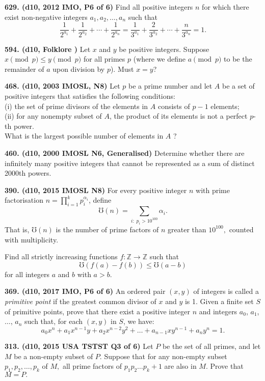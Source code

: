 \documentclass{article}
\begin{document}
\textbf{629. (\color{red}d10\color{black}, 2012 IMO, P6 of 6)} Find all positive integers $n$ for which there exist non-negative integers $a_1, a_2, \ldots, a_n$ such that
\[
    \frac{1}{2^{a_1}} + \frac{1}{2^{a_2}} + \cdots + \frac{1}{2^{a_n}} =
    \frac{1}{3^{a_1}} + \frac{2}{3^{a_2}} + \cdots + \frac{n}{3^{a_n}} = 1.
\]

\textbf{594. (\color{red}d10\color{black}, Folklore )} Let $x$ and $y$ be positive integers. Suppose $x \pmod{p} \leq y \pmod{p}$ for all primes $p$ (where we define $a \pmod{p}$ to be the remainder of $a$ upon division by $p$). Must $x = y$?

\textbf{468. (\color{red}d10\color{black}, 2003 IMOSL, N8)} Let $p$ be a prime number and let $A$ be a set of positive integers that satisfies the following conditions:\\ (i) the set of prime divisors of the elements in $A$ consists of $p-1$ elements;\\ (ii) for any nonempty subset of $A$, the product of its elements is not a perfect $p$-th power.\\ What is the largest possible number of elements in $A$ ?

\textbf{460. (\color{red}d10\color{black}, 2000 IMOSL N6, Generalised)} Determine whether there are infinitely many positive integers that cannot be represented as a sum of distinct 2000th powers.

\textbf{390. (\color{red}d10\color{black}, 2015 IMOSL N8)} For every positive integer $n$ with prime factorisation $\textstyle{n = \prod_{i = 1}^{k} p_i^{\alpha_i}}$, define \[\mho(n) = \sum_{i: \; p_i > 10^{100}} \alpha_i.\] That is, $\mho(n)$ is the number of prime factors of $n$ greater than $10^{100},$ counted with multiplicity.

\makebox[1.5em]{} Find all strictly increasing functions $f: \mathbb{Z} \to \mathbb{Z}$ such that \[\mho \left( f(a) - f(b) \right) \leq \mho (a - b)\] for all integers \(a\) and \(b\) with \(a > b\).

\textbf{369. (\color{red}d10\color{black}, 2017 IMO, P6 of 6)} An ordered pair $(x, y)$ of integers is called a \emph{primitive point} if the greatest common divisor of $x$ and $y$ is 1. Given a finite set $S$ of primitive points, prove that there exist a positive integer $n$ and integers $a_0$, $a_1$, $\dots$, $a_n$ such that, for each $(x, y)$ in $S$, we have: $$a_0 x^n + a_1x^{n - 1}y + a_2 x^{n - 2}y^2 + \dots + a_{n - 1}x y^{n - 1} + a_n y^n = 1.$$

\textbf{313. (\color{red}d10\color{black}, 2015 USA TSTST Q3 of 6)} Let $P$ be the set of all primes, and let $M$ be a non-empty subset of $P.$ Suppose that for any non-empty subset $p_1, p_2, \dots, p_k$ of $M,$ all prime factors of $p_1p_2\dots p_k + 1$ are also in $M.$ Prove that $M = P.$
\end{document}
